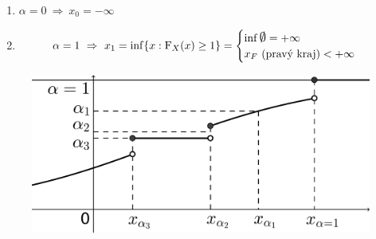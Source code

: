 \begin{example}
	\begin{enumerate}
		\item $\alpha=0 ~\Rightarrow~ x_0=-\infty$
		\item \[\alpha=1 ~\Rightarrow~ x_1=\inf\{ x:\FF_X(x)\geq 1 \}=\begin{cases}
		\inf \emptyset=+\infty \\
		x_F~(\text{pravý kraj})<+\infty
		\end{cases}
		\]
	\end{enumerate}
\end{example}
\begin{figure}[h]
	\centering
	\includegraphics[width=0.60\linewidth]{neintegralnicharakteristiky1}
	\label{fig:neintegralnicharakteristiky1}
\end{figure}

